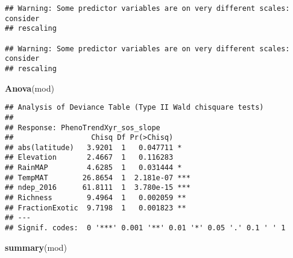 \documentclass[
]{article}
\newenvironment{Shaded}{\begin{snugshade}}{\end{snugshade}}
\newcommand{\KeywordTok}[1]{\textcolor[rgb]{0.13,0.29,0.53}{\textbf{#1}}}
\newcommand{\NormalTok}[1]{#1}
\begin{document}
\begin{verbatim}
## Warning: Some predictor variables are on very different scales: consider
## rescaling

## Warning: Some predictor variables are on very different scales: consider
## rescaling
\end{verbatim}

\begin{Shaded}
\begin{Highlighting}[]
\KeywordTok{Anova}\NormalTok{(mod)}
\end{Highlighting}
\end{Shaded}

\begin{verbatim}
## Analysis of Deviance Table (Type II Wald chisquare tests)
## 
## Response: PhenoTrendXyr_sos_slope
##                  Chisq Df Pr(>Chisq)    
## abs(latitude)   3.9201  1   0.047711 *  
## Elevation       2.4667  1   0.116283    
## RainMAP         4.6285  1   0.031444 *  
## TempMAT        26.8654  1  2.181e-07 ***
## ndep_2016      61.8111  1  3.780e-15 ***
## Richness        9.4964  1   0.002059 ** 
## FractionExotic  9.7198  1   0.001823 ** 
## ---
## Signif. codes:  0 '***' 0.001 '**' 0.01 '*' 0.05 '.' 0.1 ' ' 1
\end{verbatim}

\begin{Shaded}
\begin{Highlighting}[]
\KeywordTok{summary}\NormalTok{(mod)}
\end{Highlighting}
\end{Shaded}
\end{document}
